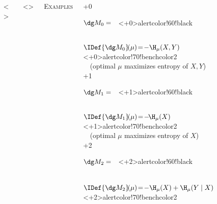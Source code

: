 \begin{frame}[t,label=semantics2]
\begin{columns}[c]
{{\begin{column}{\pdgdefnwidth}
\begin{defn}[$\IDef{}$]
				\alt<\halfblocks>{\vspace{1.8em}}{\vspace{3em}}
			\end{defn}
			\end{column}}}
		\only<\IDEFexrange>{ %
			\column{\textwidth-\pdgdefnwidth}
			\vspace{-4em}

			{\centering\Large\color{structurecolor}\textsc{Examples}\par}

			\medskip
			\setlength{\leftmargini}{1.5em}
			\begin{itemize}
				+0 
					{$\dg M_0=\quad$\color<\IDEFex+0>{alertcolor!60!black}\hfill}~\\[0.3em]
					{\small\!$\IDef{\dg M_0}\!(\mu)\! =\!  - \H_\mu(X,Y)$}
					{\footnotesize\color{gray}\color<\IDEFex+0>{alertcolor!70!benchcolor2}%
					\\[-0.3em]~~(optimal $\mu$ maximizes entropy of $X,Y$)}~ \\[0.2em]
				+1
					{$\dg M_1=\quad$\color<\IDEFex+1>{alertcolor!60!black}\hfill}~\\[0.3em]
					{\small\!$\IDef{\dg M_1}\!(\mu)\! =\! -\!\H_\mu(X)$}
					{\footnotesize\color{gray}\color<\IDEFex+1>{alertcolor!70!benchcolor2}\\[-0.3em]%
						~~(optimal $\mu$ maximizes entropy of $X$)}~  \\[0.2em]
				+2
					{$\dg M_2=\quad$\color<\IDEFex+2>{alertcolor!60!black}\hfill}~\\[0.3em]
					{\small\!$\IDef{\dg M_2}\!(\mu)\! =\!  - \H_\mu(X) + \H_\mu(Y\mid X)$}
					{\footnotesize\\\color{gray}\color<\IDEFex+2>{alertcolor!70!benchcolor2}%
}
\end{itemize}}
\end{columns}
\end{frame}
